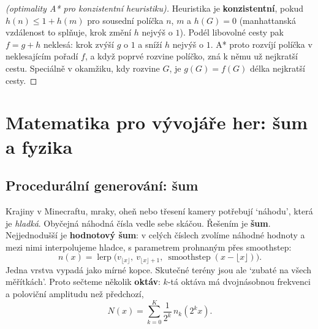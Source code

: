 \begin{proof}[(optimality A* pro konzistentní heuristiku)]
  Heuristika je \textbf{konzistentní}, pokud $h(n)\leq 1 + h(m)$ pro sousední políčka $n$, $m$ a $h(G) = 0$ (manhattanská vzdálenost to splňuje, krok změní $h$ nejvýš o $1$). Podél libovolné cesty pak $f = g + h$ neklesá: krok zvýší $g$ o $1$ a sníží $h$ nejvýš o $1$. A* proto rozvíjí políčka v neklesajícím pořadí $f$, a když poprvé rozvine políčko, zná k němu už nejkratší cestu. Speciálně v okamžiku, kdy rozvine $G$, je $g(G) = f(G)$ délka nejkratší cesty.
\end{proof}

\section{Matematika pro vývojáře her: šum a fyzika}

\subsection{Procedurální generování: šum}

Krajiny v Minecraftu, mraky, oheň nebo třesení kamery potřebují `náhodu', která je \textit{hladká}. Obyčejná náhodná čísla vedle sebe skáčou. Řešením je \textbf{šum}. Nejjednodušší je \textbf{hodnotový šum}: v celých číslech zvolíme náhodné hodnoty a mezi nimi interpolujeme hladce, s parametrem prohnaným přes smoothstep:
\begin{equation*}
  n(x) = \operatorname{lerp}\big(v_{\lfloor x\rfloor},\ v_{\lfloor x\rfloor + 1},\ \operatorname{smoothstep}(x - \lfloor x\rfloor)\big).
\end{equation*}
Jedna vrstva vypadá jako mírné kopce. Skutečné terény jsou ale `zubaté na všech měřítkách'. Proto sečteme několik \textbf{oktáv}: $k$-tá oktáva má dvojnásobnou frekvenci a poloviční amplitudu než předchozí,
\begin{equation*}
  N(x) = \sum_{k=0}^{K}\frac{1}{2^k}\,n_k(2^kx).
\end{equation*}

